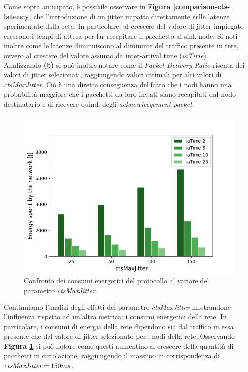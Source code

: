 \documentclass[binding=0.6cm,TFA]{sapthesis}
\begin{document}
Come sopra anticipato, è possibile osservare in \textbf{Figura \ref{comparison-cts-latency}} che l'introduzione di un jitter impatta direttamente sulle
latenze sperimentate dalla rete. In particolare, al crescere del valore di jitter impiegato crescono i tempi di attesa per far recepitare il pacchetto al sink node.
Si noti inoltre come le latenze diminuiscono al diminuire del traffico presente in rete, ovvero al crescere del valore assunto da inter-arrival time (\emph{iaTime}).\\

Analizzando \textbf{(b)} si può inoltre notare come il \emph{Packet Delivery Ratio} risenta dei valori di jitter selezionati, raggiungendo valori ottimali per
alti valori di \emph{ctsMaxJitter}. Ciò è una diretta conseguenza del fatto che i nodi hanno una probabilità maggiore che i pacchetti da loro inviati siano
recapitati dal nodo destinatario e di ricevere quindi degli \emph{acknowledgement packet}.

\begin{figure}
    \begin{center}
        \includegraphics[scale=0.5]{energy_jitter_comparison_plot.png}
        \caption{Confronto dei consumi energetici del protocollo al variare del parametro \emph{ctsMaxJitter}.}
        \label{comparison-cts-energy}
    \end{center}
\end{figure}

Continuiamo l'analisi degli effetti del parametro \emph{ctsMaxJitter} mostrandone l'influenza rispetto ad un'altra metrica: i consumi energetici della rete. In
particolare, i consumi di energia della rete dipendono sia dal traffico in essa presente che dal valore di jitter selezionato per i nodi della rete. Osservando
\textbf{Figura \ref{comparison-cts-energy}} si può notare come questi aumentino al crescere della quantità di pacchetti in circolazione, raggiungendo il
massimo in corrispondenza di $\emph{ctsMaxJitter}=150ms$.\\
\end{document}
